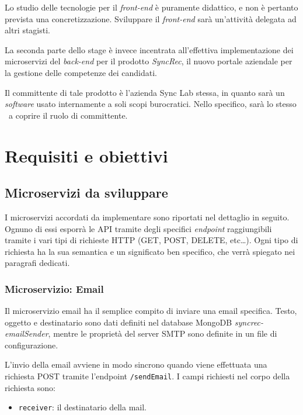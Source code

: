 Lo studio delle tecnologie per il \textit{front-end} è puramente didattico, e non è pertanto prevista una concretizzazione.
Sviluppare il \textit{front-end} sarà un'attività delegata ad altri stagisti.

La seconda parte dello stage è invece incentrata all'effettiva implementazione dei microservizi del \textit{back-end} per il prodotto \textit{SyncRec}, il nuovo portale aziendale per la gestione delle competenze dei candidati.

Il committente di tale prodotto è l'azienda Sync Lab stessa, in quanto sarà un \textit{software} usato internamente a soli scopi burocratici.
Nello specifico, sarà lo stesso \fabio\ a coprire il ruolo di committente.

\section{Requisiti e obiettivi}

\subsection{Microservizi da sviluppare}

I microservizi accordati da implementare sono riportati nel dettaglio in seguito. Ognuno di essi esporrà le API tramite degli specifici \textit{endpoint}
raggiungibili tramite i vari tipi di richieste HTTP (GET, POST, DELETE, etc\dots).
Ogni tipo di richiesta ha la sua semantica e un significato ben specifico, che verrà spiegato nei paragrafi dedicati.


\subsubsection{Microservizio: Email}

Il microservizio email ha il semplice compito di inviare una email specifica.
Testo, oggetto e destinatario sono dati definiti nel database MongoDB
\textit{syncrec-emailSender}, mentre le proprietà del server SMTP sono definite in un file di configurazione.

L'invio della email avviene in modo sincrono quando viene effettuata una richiesta POST tramite l'endpoint \texttt{/sendEmail}.
I campi richiesti nel corpo della richiesta sono:
\begin{itemize}
	\item \texttt{receiver}: il destinatario della mail.
\end{itemize}

